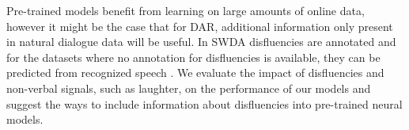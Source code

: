 \documentclass[11pt,a4paper,headings=standardclasses]{article}
\begin{document}
  Pre-trained models benefit from learning on large amounts of online data, however it might be the case that for DAR, additional information only present in natural dialogue data will be useful. In SWDA disfluencies are annotated and for the datasets where no annotation for disfluencies is available, they can be predicted from recognized speech \citep{hough2017joint,shalyminov2018multi}. We evaluate the impact of disfluencies and non-verbal signals, such as laughter, on the performance of our models and suggest the ways to include information about disfluencies into pre-trained neural models. 


{}

\end{document}
